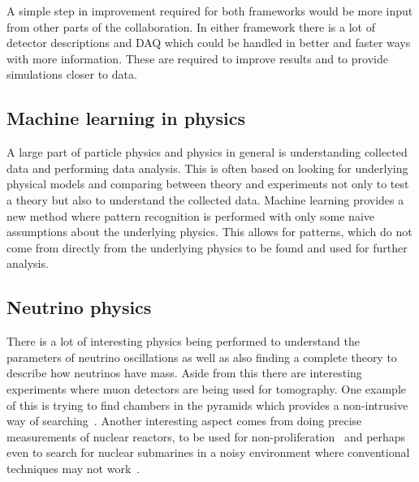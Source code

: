 A simple step in improvement required for both frameworks would be more input from other parts of the collaboration. In either framework there is a lot of detector descriptions and DAQ which could be handled in better and faster ways with more information. These are required to improve results and to provide simulations closer to data.


\subsection{Machine learning in physics}

A large part of particle physics and physics in general is understanding collected data and performing data analysis. This is often based on looking for underlying physical models and comparing between theory and experiments not only to test a theory but also to understand the collected data. Machine learning provides a new method where pattern recognition is performed with only some naive assumptions about the underlying physics. This allows for patterns, which do not come from directly from the underlying physics to be found and used for further analysis.

\subsection{Neutrino physics}

There is a lot of interesting physics being performed to understand the parameters of neutrino oscillations as well as also finding a complete theory to describe how neutrinos have mass. Aside from this there are interesting experiments where muon detectors are being used for tomography. One example of this is trying to find chambers in the pyramids which provides a non-intrusive way of searching~\cite{86Morishima}. Another interesting aspect comes from doing precise measurements of nuclear reactors, to be used for non-proliferation~\cite{87Askins} and perhaps even to search for nuclear submarines in a noisy environment where conventional techniques may not work~\cite{88Jocher}.

\fi
